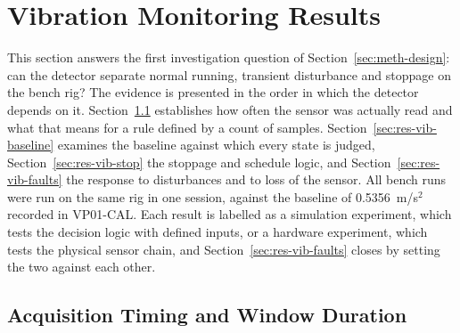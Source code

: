 %

\section{Vibration Monitoring Results}
\label{sec:results-vibration}

This section answers the first investigation question of Section~\ref{sec:meth-design}: can the
detector separate normal running, transient disturbance and stoppage on the bench rig? The evidence
is presented in the order in which the detector depends on it. Section~\ref{sec:res-vib-timing}
establishes how often the sensor was actually read and what that means for a rule defined by a count
of samples. Section~\ref{sec:res-vib-baseline} examines the baseline against which every state is
judged, Section~\ref{sec:res-vib-stop} the stoppage and schedule logic, and
Section~\ref{sec:res-vib-faults} the response to disturbances and to loss of the sensor. All bench runs
were run on the same rig in one session, against the baseline of 0.5356~m/s$^2$ recorded in VP01-CAL.
Each result is labelled as a simulation experiment, which tests the decision logic with defined inputs, or
a hardware experiment, which tests the physical sensor chain, and Section~\ref{sec:res-vib-faults} closes
by setting the two against each other.

\subsection{Acquisition Timing and Window Duration}
\label{sec:res-vib-timing}

